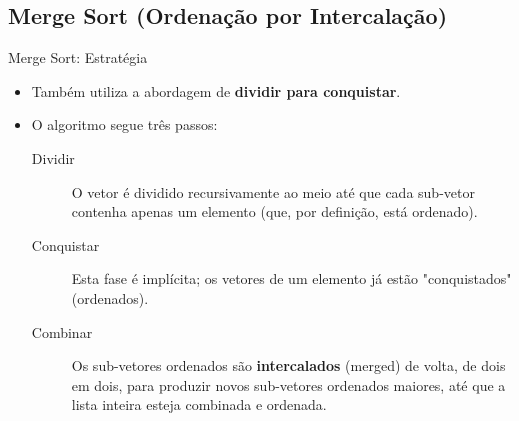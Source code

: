 \documentclass{beamer}
\begin{document}
\subsection{Merge Sort (Ordenação por Intercalação)}
\begin{frame}{Merge Sort: Estratégia}
\begin{itemize}
 \item Também utiliza a abordagem de \textbf{dividir para conquistar}.
 \item O algoritmo segue três passos:
 \begin{description}
  \item[Dividir] O vetor é dividido recursivamente ao meio até que cada sub-vetor contenha apenas um elemento (que, por definição, está ordenado).
  \item[Conquistar] Esta fase é implícita; os vetores de um elemento já estão "conquistados" (ordenados).
  \item[Combinar] Os sub-vetores ordenados são \textbf{intercalados} (merged) de volta, de dois em dois, para produzir novos sub-vetores ordenados maiores, até que a lista inteira esteja combinada e ordenada.
 \end{description}
\end{itemize}
\end{frame}
\end{document}
